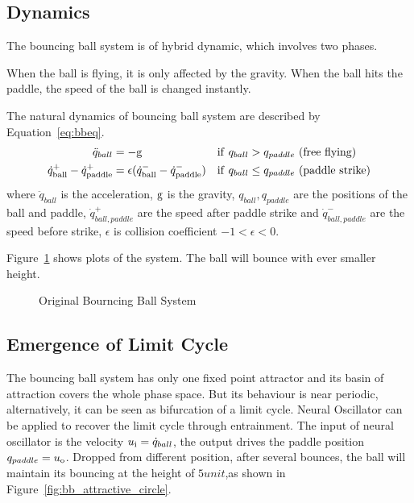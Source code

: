 \subsection*{Dynamics}
The bouncing ball system is of hybrid dynamic, which involves two phases.
\begin{itemize}
When the ball is flying, it is only affected by the gravity.
When the ball hits the paddle, the speed of the ball is changed instantly.
\end{itemize}
The natural dynamics of bouncing ball system are described by  Equation~\ref{eq:bbeq}.
\begin{align}
\ddot{q}_{ball}&=-\mathrm{g} &\mathrm{if}\,\,q_{ball} &> q_{paddle}\,\,\mathrm{(free\,\,flying)} \nonumber\\
\dot{q}^{+}_{\mathrm{ball}} - \dot{q}^{+}_{\mathrm{paddle}} &=  \epsilon(\dot{q}^{-}_{\mathrm{ball}} - \dot{q}^{-}_{\mathrm{paddle}})&\mathrm{if}\,\,q_{ball} &\leq {q_{paddle}}\,\,\mathrm{(paddle\,\,strike)}
\label{eq:bbeq}
\end{align}
where $\ddot{q}_{ball}$ is the acceleration,
$\mathrm{g}$ is the gravity,
$q_{ball},q_{paddle}$ are the positions of the ball and paddle,
$\dot{q}^{+}_{ball,paddle}$ are the speed after paddle strike and $\dot{q}^{-}_{ball,paddle}$ are the speed before strike,
$\epsilon$ is collision coefficient $-1 < \epsilon <0$.

Figure~\ref{fig:bborg} shows  plots of the system. 
The ball will bounce with ever smaller height. 




\begin{figure}[h]
\begin{center}
	
\end{center}
\caption{Original Bourncing Ball System}
\label{fig:bborg}
\end{figure}



\subsection*{Emergence of Limit Cycle}
The  bouncing ball system has only one fixed point attractor and its basin of attraction covers the whole phase space.
But its behaviour is near periodic, alternatively, it can be seen as bifurcation of a limit cycle.
Neural Oscillator can be applied to recover the limit cycle through entrainment.
The input of neural oscillator is the velocity $u_{\mathrm{i}}=\dot{q}_{ball}$, the output drives the paddle position $q_{paddle}=u_{\mathrm{o}}$.
Dropped from different position, after several bounces, the ball will maintain its bouncing at the height of $5 unit$,as shown in Figure~\ref{fig:bb_attractive_circle}.

